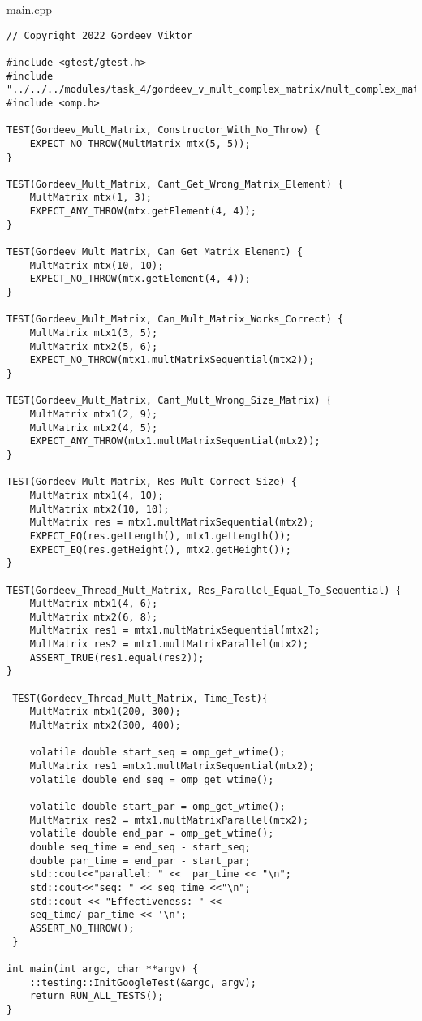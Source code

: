 \documentclass{report}
\begin{document}
main.cpp
\begin{lstlisting}
// Copyright 2022 Gordeev Viktor

#include <gtest/gtest.h>
#include "../../../modules/task_4/gordeev_v_mult_complex_matrix/mult_complex_matrix.h"
#include <omp.h>

TEST(Gordeev_Mult_Matrix, Constructor_With_No_Throw) {
    EXPECT_NO_THROW(MultMatrix mtx(5, 5));
}

TEST(Gordeev_Mult_Matrix, Cant_Get_Wrong_Matrix_Element) {
    MultMatrix mtx(1, 3);
    EXPECT_ANY_THROW(mtx.getElement(4, 4));
}

TEST(Gordeev_Mult_Matrix, Can_Get_Matrix_Element) {
    MultMatrix mtx(10, 10);
    EXPECT_NO_THROW(mtx.getElement(4, 4));
}

TEST(Gordeev_Mult_Matrix, Can_Mult_Matrix_Works_Correct) {
    MultMatrix mtx1(3, 5);
    MultMatrix mtx2(5, 6);
    EXPECT_NO_THROW(mtx1.multMatrixSequential(mtx2));
}

TEST(Gordeev_Mult_Matrix, Cant_Mult_Wrong_Size_Matrix) {
    MultMatrix mtx1(2, 9);
    MultMatrix mtx2(4, 5);
    EXPECT_ANY_THROW(mtx1.multMatrixSequential(mtx2));
}

TEST(Gordeev_Mult_Matrix, Res_Mult_Correct_Size) {
    MultMatrix mtx1(4, 10);
    MultMatrix mtx2(10, 10);
    MultMatrix res = mtx1.multMatrixSequential(mtx2);
    EXPECT_EQ(res.getLength(), mtx1.getLength());
    EXPECT_EQ(res.getHeight(), mtx2.getHeight());
}

TEST(Gordeev_Thread_Mult_Matrix, Res_Parallel_Equal_To_Sequential) {
    MultMatrix mtx1(4, 6);
    MultMatrix mtx2(6, 8);
    MultMatrix res1 = mtx1.multMatrixSequential(mtx2);
    MultMatrix res2 = mtx1.multMatrixParallel(mtx2);
    ASSERT_TRUE(res1.equal(res2));
}

 TEST(Gordeev_Thread_Mult_Matrix, Time_Test){
    MultMatrix mtx1(200, 300);
    MultMatrix mtx2(300, 400);

    volatile double start_seq = omp_get_wtime();
    MultMatrix res1 =mtx1.multMatrixSequential(mtx2);
    volatile double end_seq = omp_get_wtime();

    volatile double start_par = omp_get_wtime();
    MultMatrix res2 = mtx1.multMatrixParallel(mtx2);
    volatile double end_par = omp_get_wtime();
    double seq_time = end_seq - start_seq;
    double par_time = end_par - start_par;
    std::cout<<"parallel: " <<  par_time << "\n";
    std::cout<<"seq: " << seq_time <<"\n";
    std::cout << "Effectiveness: " <<
    seq_time/ par_time << '\n';
    ASSERT_NO_THROW();
 }

int main(int argc, char **argv) {
    ::testing::InitGoogleTest(&argc, argv);
    return RUN_ALL_TESTS();
}

\end{lstlisting}
\end{document}
